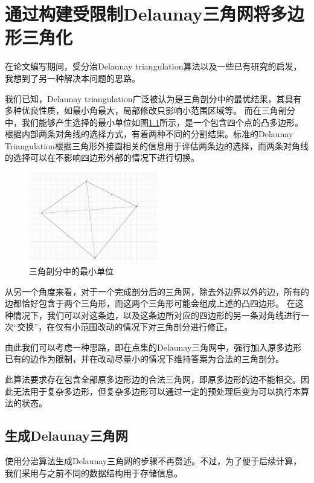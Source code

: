 \chapter{通过构建受限制Delaunay三角网将多边形三角化}

在论文编写期间，受分治Delaunay triangulation算法以及一些已有研究的启发，我想到了另一种解决本问题的思路。

我们已知，Delaunay triangulation广泛被认为是三角剖分中的最优结果，其具有多种优良性质，如最小角最大，局部修改只影响小范围区域等。
而在三角剖分中，我们能够产生选择的最小单位如图\ref*{basecell}所示，是一个包含四个点的凸多边形。根据内部两条对角线的选择方式，有着两种不同的分割结果。标准的Delaunay Triangulation根据三角形外接圆相关的信息用于评估两条边的选择，而两条对角线的选择可以在不影响四边形外部的情况下进行切换。

\begin{figure}[htp]
    \centering
    \includegraphics[width=0.5\textwidth]
    {figures/basecell.png}
    \caption{三角剖分中的最小单位}
    \label{basecell}
  \end{figure}

从另一个角度来看，对于一个完成剖分后的三角网，除去外边界以外的边，所有的边都恰好包含于两个三角形，而这两个三角形可能会组成上述的凸四边形。
在这种情况下，我们可以对这条边，以及这条边所对应的四边形的另一条对角线进行一次“交换”，在仅有小范围改动的情况下对三角剖分进行修正。

由此我们可以考虑一种思路，即在点集的Delaunay三角网中，强行加入原多边形已有的边作为限制，并在改动尽量小的情况下维持答案为合法的三角剖分。

此算法要求存在包含全部原多边形边的合法三角网，即原多边形的边不能相交。因此无法用于复杂多边形，但复杂多边形可以通过一定的预处理后变为可以执行本算法的状态。

\section{生成Delaunay三角网}
使用分治算法生成Delaunay三角网的步骤不再赘述。不过，为了便于后续计算，我们采用与之前不同的数据结构用于存储信息。

